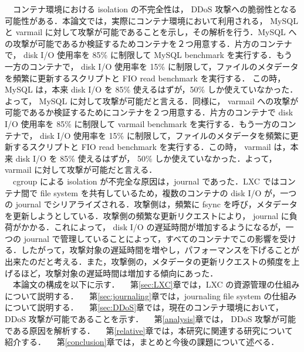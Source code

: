 \documentclass[graduation-thesis]{jsarticle}
\begin{document}
　コンテナ環境における isolation の不完全性は， DDoS 攻撃への脆弱性となる可能性がある．本論文では，実際にコンテナ環境において利用される， MySQL と varmail に対して攻撃が可能であることを示し，その解析を行う．MySQL への攻撃が可能であるか検証するためコンテナを２つ用意する．片方のコンテナで， disk I/O 使用率を 85\% に制限して MySQL benchmark を実行する．もう一方のコンテナで， disk I/O 使用率を 15\% に制限して，ファイルのメタデータを頻繁に更新するスクリプトと FIO read benchmark を実行する． この時， MySQL は，本来 disk I/O を 85\% 使えるはずが，50\% しか使えていなかった．よって， MySQL に対して攻撃が可能だと言える．同様に， varmail への攻撃が可能であるか検証するためにコンテナを２つ用意する．片方のコンテナで disk I/O 使用率を 85\% に制限して varmail benchmark を実行する．もう一方のコンテナで， disk I/O 使用率を 15\% に制限して，ファイルのメタデータを頻繁に更新するスクリプトと FIO read benchmark を実行する．この時， varmail は，本来 disk I/O を 85\% 使えるはずが， 50\% しか使えていなかった．よって， varmail に対して攻撃が可能だと言える．\\
　cgroup による isolation が不完全な原因は，journal であった．LXC ではコンテナ間で file system を共有しているため，複数のコンテナの disk I/O が，一つの journal でシリアライズされる．攻撃側は，頻繁に fsync を呼び，メタデータを更新しようとしている．攻撃側の頻繁な更新リクエストにより， journal に負荷がかかる．これによって， disk I/O の遅延時間が増加するようになるが，一つの journal で管理していることによって，すべてのコンテナでこの影響を受ける．したがって，攻撃対象の遅延時間を増やし，パフォーマンスを下げることが出来たのだと考える．また，攻撃側の，メタデータの更新リクエストの頻度を上げるほど，攻撃対象の遅延時間は増加する傾向にあった．\\
　本論文の構成を以下に示す．
　第\ref{sec:LXC}章では，LXC の資源管理の仕組みについて説明する．
　第\ref{sec:journaling}章では，journaling file system の仕組みについて説明する．
　第\ref{sec:DDoS}章では，現在のコンテナ環境において， DDoS 攻撃が可能であることを示す．
　第\ref{analysis}章では， DDoS 攻撃が可能である原因を解析する．
　第\ref{relative}章では，本研究に関連する研究について紹介する．
　第\ref{conclusion}章では，まとめと今後の課題について述べる．
　
\clearpage
\end{document}
